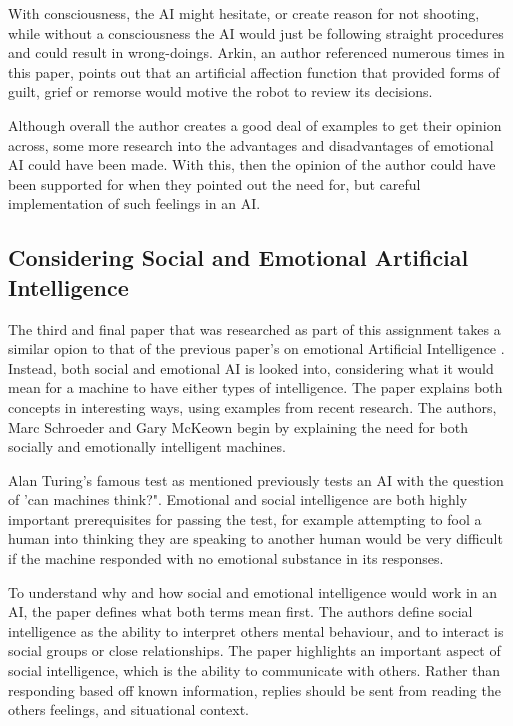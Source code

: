 \documentclass[article]{IEEEtran}
\begin{document}
With consciousness, the AI might hesitate, or create reason for not shooting, while without a consciousness the AI would just be following straight procedures and could result in wrong-doings. Arkin, an author referenced numerous times in this paper, points out that an artificial affection function that provided forms of guilt, grief or remorse would motive the robot to review its decisions. \par
Although overall the author creates a good deal of examples to get their opinion across, some more research into the advantages and disadvantages of emotional AI could have been made. With this, then the opinion of the author could have been supported for when they pointed out the need for, but careful implementation of such feelings in an AI.

\subsection{Considering Social and Emotional Artificial Intelligence}
The third and final paper that was researched as part of this assignment takes a similar opion to that of the previous paper's on emotional Artificial Intelligence \cite{ethicsSocial}. Instead, both social and emotional AI is looked into, considering what it would mean for a machine to have either types of intelligence. The paper explains both concepts in interesting ways, using examples from recent research. The authors, Marc Schroeder and Gary McKeown begin by explaining the need for both socially and emotionally intelligent machines. \par
Alan Turing's famous test as mentioned previously tests an AI with the question of 'can machines think?". Emotional and social intelligence are both highly important prerequisites for passing the test, for example attempting to fool a human into thinking they are speaking to another human would be very difficult if the machine responded with no emotional substance in its responses.	\par
To understand why and how social and emotional intelligence would work in an AI, the paper defines what both terms mean first. The authors define social intelligence as the ability to interpret others mental behaviour, and to interact is social groups or close relationships. The paper highlights an important aspect of social intelligence, which is the ability to communicate with others. Rather than responding based off known information, replies should be sent from reading the others feelings, and situational context.\par
\end{document}
